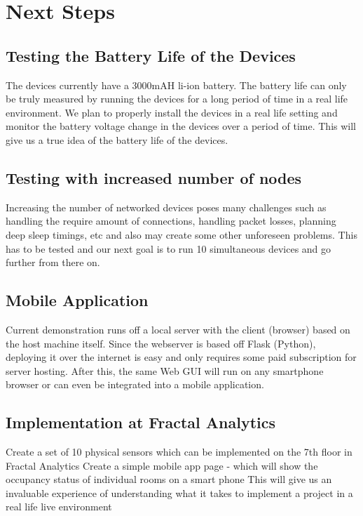\chapter{Next Steps}

\section{Testing the Battery Life of the Devices}
The devices currently have a 3000mAH li-ion battery. The battery life can only be truly measured by running the devices for a long period of time in a real life environment. We plan to properly install the devices in a real life setting and monitor the battery voltage change in the devices over a period of time. This will give us a true idea of the battery life of the devices.

\section{Testing with increased number of nodes}
Increasing the number of networked devices poses many challenges such as handling the require amount of connections, handling packet losses, planning deep sleep timings, etc and also may create some other unforeseen problems. This has to be tested and our next goal is to run 10 simultaneous devices and go further from there on.

\section{Mobile Application}
Current demonstration runs off a local server with the client (browser) based on the host machine itself. Since the webserver is based off Flask (Python), deploying it over the internet is easy and only requires some paid subscription for server hosting. After this, the same Web GUI will run on any smartphone browser or can even be integrated into a mobile application.      

\section{Implementation at Fractal Analytics}
Create a set of 10 physical sensors which can be implemented on the 7th floor in Fractal Analytics
Create a simple mobile app page - which will show the occupancy status of individual rooms on a smart phone
This will give us an invaluable experience of understanding what it takes to implement a project in a real life live environment